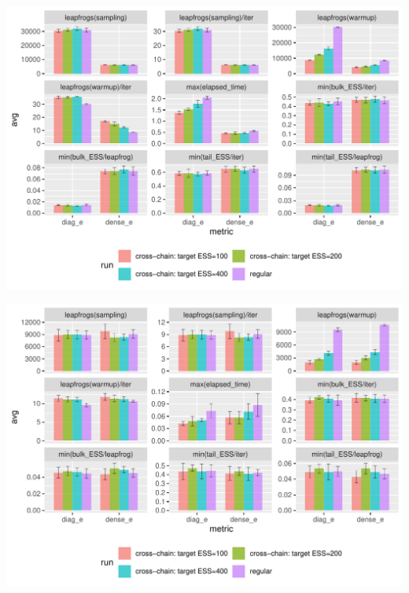 \documentclass[landscape,a0paper,fontscale=0.45]{baposter} %
\newenvironment{ColFigure}
  {\par\medskip\noindent\minipage{\linewidth}}
  {\endminipage\par\medskip}
\begin{document}
\begin{poster}
{\begin{multicols}{2}
\begin{ColFigure}
\centering
\includegraphics[width=0.95\linewidth]{./figure/cross_chain_ess_effect_arK.pdf}
\end{ColFigure}

\begin{ColFigure}
\centering
\includegraphics[width=0.95\linewidth]{./figure/cross_chain_ess_effect_eight_schools.pdf}
\end{ColFigure}


\end{multicols}}
\end{poster}
\end{document}
